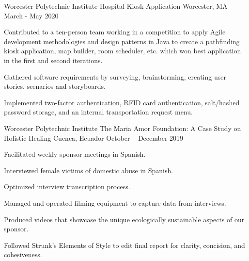 

\begin{cventries}

  \cventry
    {Worcester Polytechnic Institute} %
    {Hospital Kiosk Application } %
    {Worcester, MA} %
    {March - May 2020} %
    {
      \begin{cvitems} %
       \item {Contributed to a ten-person team working in a competition to apply Agile development methodologies and
        design patterns in Java to create a pathfinding kiosk application, map builder, room scheduler, etc. which won best application in the first and second iterations.}
        \item {Gathered software requirements by surveying, brainstorming, creating user stories, scenarios and storyboards.}
        \item {Implemented two-factor authentication, RFID card authentication, salt/hashed password storage, and an internal transportation request menu.}
      \end{cvitems}
    }


  \cventry
    {Worcester Polytechnic Institute} %
    {The Maria Amor Foundation: A Case Study on Holistic Healing} %
    {Cuenca, Ecuador} %
    {October – December 2019} %
    {
      \begin{cvitems} %
        \item {Facilitated weekly sponsor meetings in Spanish.}
        \item {Interviewed female victims of domestic abuse in Spanish.}
        \item {Optimized interview transcription process.}
        \item {Managed and operated filming equipment to capture data from
        interviews.}
        \item {Produced videos that showcase the unique ecologically sustainable aspects of our sponsor.}
        \item {Followed
        Strunk’s Elements of Style to edit final report for clarity, concision, and cohesiveness.}
      \end{cvitems}
    }

\end{cventries}

